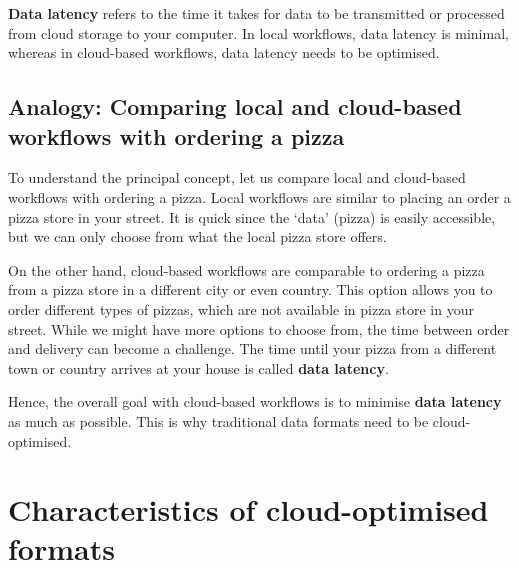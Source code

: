 \documentclass[
  letterpaper,
  DIV=11,
  numbers=noendperiod]{scrreprt}
\begin{document}
\begin{tcolorbox}[enhanced jigsaw, coltitle=black, colback=white, leftrule=.75mm, colbacktitle=quarto-callout-note-color!10!white, titlerule=0mm, title=\textcolor{quarto-callout-note-color}{\faInfo}\hspace{0.5em}{Note}, rightrule=.15mm, bottomrule=.15mm, bottomtitle=1mm, toptitle=1mm, arc=.35mm, toprule=.15mm, left=2mm, opacityback=0, colframe=quarto-callout-note-color-frame, opacitybacktitle=0.6, breakable]

\textbf{Data latency} refers to the time it takes for data to be
transmitted or processed from cloud storage to your computer. In local
workflows, data latency is minimal, whereas in cloud-based workflows,
data latency needs to be optimised.

\end{tcolorbox}

\subsection{Analogy: Comparing local and cloud-based workflows with
ordering a
pizza}\label{analogy-comparing-local-and-cloud-based-workflows-with-ordering-a-pizza}

To understand the principal concept, let us compare local and
cloud-based workflows with ordering a pizza. Local workflows are similar
to placing an order a pizza store in your street. It is quick since the
`data' (pizza) is easily accessible, but we can only choose from what
the local pizza store offers.

On the other hand, cloud-based workflows are comparable to ordering a
pizza from a pizza store in a different city or even country. This
option allows you to order different types of pizzas, which are not
available in pizza store in your street. While we might have more
options to choose from, the time between order and delivery can become a
challenge. The time until your pizza from a different town or country
arrives at your house is called \textbf{data latency}.

Hence, the overall goal with cloud-based workflows is to minimise
\textbf{data latency} as much as possible. This is why traditional data
formats need to be cloud-optimised.

\section{Characteristics of cloud-optimised
formats}\label{characteristics-of-cloud-optimised-formats}
\end{document}
